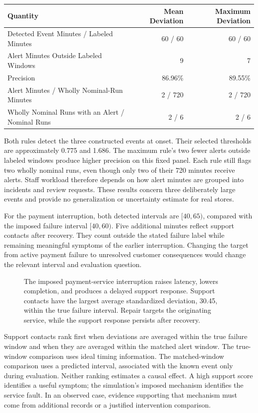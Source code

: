 \begin{table}[H]
\centering\small
\begin{tabular}{@{}lrr@{}}
\toprule
Quantity & Mean Deviation & Maximum Deviation \\
\midrule

Detected Event Minutes / Labeled Minutes & 60 / 60 & 60 / 60 \\
Alert Minutes Outside Labeled Windows & 9 & 7 \\
Precision & 86.96\% & 89.55\% \\
Alert Minutes / Wholly Nominal-Run Minutes & 2 / 720 & 2 / 720 \\
Wholly Nominal Runs with an Alert / Nominal Runs & 2 / 6 & 2 / 6 \\
\bottomrule
\end{tabular}
\end{table}

Both rules detect the three constructed events at onset. Their selected
thresholds are approximately 0.775 and 1.686. The maximum rule's two
fewer alerts outside labeled windows produce higher precision on this
fixed panel. Each rule still flags two wholly nominal runs, even though
only two of their 720 minutes receive alerts. Staff workload therefore
depends on how alert minutes are grouped into incidents and review
requests. These results concern three deliberately large events and
provide no generalization or uncertainty estimate for real stores.

For the payment interruption, both detected intervals are \([40,65)\),
compared with the imposed failure interval \([40,60)\). Five additional
minutes reflect support contacts after recovery. They count outside the
stated failure label while remaining meaningful symptoms of the earlier
interruption. Changing the target from active payment failure to
unresolved customer consequences would change the relevant interval and
evaluation question.

\begin{figure}[htbp]
\centering

\caption{The imposed payment-service interruption raises latency, lowers completion, and produces a delayed support response. Support contacts have the largest average standardized deviation, 30.45, within the true failure interval. Repair targets the originating service, while the support response persists after recovery.}\label{fig:M07_anomaly_mechanism}
\end{figure}

Support contacts rank first when deviations are averaged within the true
failure window and when they are averaged within the matched alert
window. The true-window comparison uses ideal timing information. The
matched-window comparison uses a predicted interval, associated with the
known event only during evaluation. Neither ranking estimates a causal
effect. A high support score identifies a useful symptom; the
simulation's imposed mechanism identifies the service fault. In an
observed case, evidence supporting that mechanism must come from
additional records or a justified intervention comparison.

